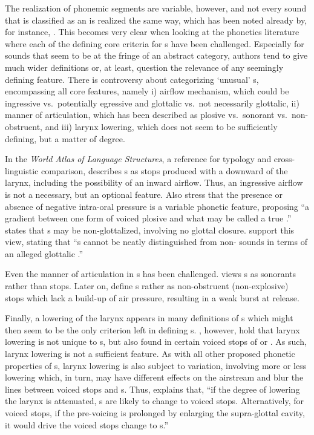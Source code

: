 \documentclass[output=paper]{LSP/langsci}
\begin{document}
The realization of phonemic segments are variable, however, and not every sound that is classified as an  is realized the same way, which has been noted already by, for instance, \citet{Greenberg1970}. This becomes very clear when looking at the phonetics literature where each of the defining core criteria for s have been challenged. Especially for sounds that seem to be at the fringe of an abstract  category, authors tend to give much wider definitions or, at least, question the relevance of any seemingly defining feature.  There is controversy about categorizing `unusual' s, encompassing all core features, namely 
i) airflow mechanism, which could be ingressive vs.\ potentially egressive and glottalic vs.\ not necessarily glottalic, 
ii) manner of articulation, which has been described as plosive vs.\ sonorant vs.\ non-obstruent, and 
iii) larynx lowering, which does not seem to be sufficiently defining, but a matter of degree.

In the {\it World Atlas of Language Structures}, a reference for typology and cross-linguistic comparison,  \citet{Maddieson2013} describes s as stops produced with a downward  of the larynx, including the possibility of an inward airflow. Thus, an ingressive airflow is not a necessary, but an optional feature. Also \citet[82]{Ladefoged1996} stress that the presence or absence of negative intra-oral pressure is a variable phonetic feature, proposing ``a gradient between one form of voiced plosive and what may be called a true .''
\citet{Lindau1984} states that s may be non-glottalized, involving no glottal closure. \citet[56]{Clements2008} support this view, stating that ``s cannot be neatly distinguished from non- sounds in terms of an alleged glottalic .''

Even the manner of articulation in s has been challenged. \citet{Clements2000} views s as sonorants rather than stops. Later on, \citet{Clements2002} define s rather as non-obstruent (non-explosive) stops which lack a build-up of air pressure, resulting in a weak burst at release.

Finally, a lowering of the larynx appears in many definitions of s which might then seem to be the only criterion left in defining s. \citet{Ewan1974}, however, hold that larynx lowering is not unique to s, but also found in certain voiced stops of  or . As such, larynx lowering is not a sufficient feature. As with all other proposed phonetic properties of s, larynx lowering is also {subject} to variation, involving more or less lowering which, in turn, may have different effects on the airstream and blur the lines between voiced stops and s. Thus, \citet[11]{Xi2009} explains that, ``if  the  degree  of  lowering  the  larynx  is  attenuated,  s  are  likely to  change  to
  voiced  stops.  Alternatively,  for  voiced  stops,  if  the  pre-voicing  is  prolonged  by  enlarging  the  supra-glottal  cavity,  it  would  drive  the  voiced  stops  change  to  s.''
\end{document}
